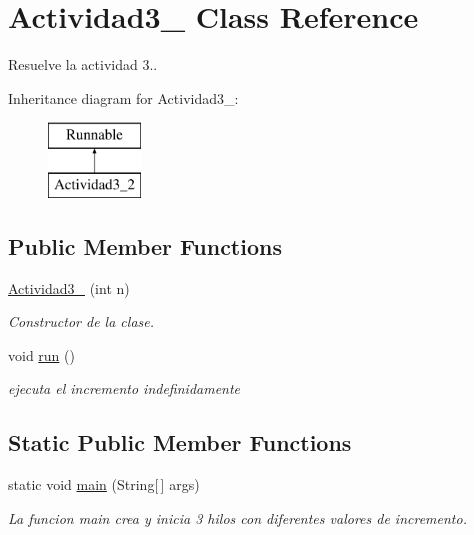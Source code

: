 \hypertarget{classActividad3__2}{}\section{Actividad3\+\_ Class Reference}
\label{classActividad3__2}


Resuelve la actividad 3..  


Inheritance diagram for Actividad3\+\_\+:\begin{figure}[H]
\begin{center}
\leavevmode
\includegraphics[height=2.000000cm]{classActividad3__2}
\end{center}
\end{figure}
\subsection*{Public Member Functions}
\begin{DoxyCompactItemize}
\item 
\hyperlink{classActividad3__2_a765178bf74270a5de1e36cfa9ae5d122}{Actividad3\+\_} (int n)
\begin{DoxyCompactList}\small\item\em Constructor de la clase. \end{DoxyCompactList}\item 
void \hyperlink{classActividad3__2_abbd52976157c9a88e6308b9b336afd3d}{run} ()
\begin{DoxyCompactList}\small\item\em ejecuta el incremento indefinidamente \end{DoxyCompactList}\end{DoxyCompactItemize}
\subsection*{Static Public Member Functions}
\begin{DoxyCompactItemize}
\item 
static void \hyperlink{classActividad3__2_a1cde3718f03eb51c4a1180742170439f}{main} (String\mbox{[}$\,$\mbox{]} args)
\begin{DoxyCompactList}\small\item\em La funcion main crea y inicia 3 hilos con diferentes valores de incremento. \end{DoxyCompactList}\end{DoxyCompactItemize}


